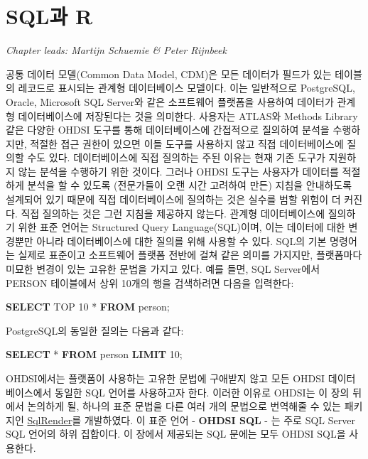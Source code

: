 \documentclass[11pt]{book}
\newenvironment{Shaded}{\begin{snugshade}}{\end{snugshade}}
\newcommand{\KeywordTok}[1]{\textcolor[rgb]{0.13,0.29,0.53}{\textbf{#1}}}
\newcommand{\DecValTok}[1]{\textcolor[rgb]{0.00,0.00,0.81}{#1}}
\newcommand{\NormalTok}[1]{#1}
\theoremstyle{definition}
\theoremstyle{definition}
\theoremstyle{definition}
\theoremstyle{remark}
\begin{document}
\chapter{SQL과 R}\label{SqlAndR}

\emph{Chapter leads: Martijn Schuemie \& Peter Rijnbeek}

공통 데이터 모델(Common Data Model, CDM)은 모든 데이터가 필드가 있는
테이블의 레코드로 표시되는 관계형 데이터베이스 모델이다. 이는 일반적으로
PostgreSQL, Oracle, Microsoft SQL Server와 같은 소프트웨어 플랫폼을
사용하여 데이터가 관계형 데이터베이스에 저장된다는 것을 의미한다.
사용자는 ATLAS와 Methods Library 같은 다양한 OHDSI 도구를 통해
데이터베이스에 간접적으로 질의하여 분석을 수행하지만, 적절한 접근 권한이
있으면 이들 도구를 사용하지 않고 직접 데이터베이스에 질의할 수도 있다.
데이터베이스에 직접 질의하는 주된 이유는 현재 기존 도구가 지원하지 않는
분석을 수행하기 위한 것이다. 그러나 OHDSI 도구는 사용자가 데이터를
적절하게 분석을 할 수 있도록 (전문가들이 오랜 시간 고려하여 만든) 지침을
안내하도록 설계되어 있기 때문에 직접 데이터베이스에 질의하는 것은 실수를
범할 위험이 더 커진다. 직접 질의하는 것은 그런 지침을 제공하지 않는다.
관계형 데이터베이스에 질의하기 위한 표준 언어는 Structured Query
Language(SQL)이며, 이는 데이터에 대한 변경뿐만 아니라 데이터베이스에
대한 질의를 위해 사용할 수 있다. SQL의 기본 명령어는 실제로 표준이고
소프트웨어 플랫폼 전반에 걸쳐 같은 의미를 가지지만, 플랫폼마다 미묘한
변경이 있는 고유한 문법을 가지고 있다. 예를 들면, SQL Server에서 PERSON
테이블에서 상위 10개의 행을 검색하려면 다음을 입력한다: 

\begin{Shaded}
\begin{Highlighting}[]
\KeywordTok{SELECT}\NormalTok{ TOP }\DecValTok{10}\NormalTok{ * }\KeywordTok{FROM}\NormalTok{ person;}
\end{Highlighting}
\end{Shaded}

PostgreSQL의 동일한 질의는 다음과 같다:

\begin{Shaded}
\begin{Highlighting}[]
\KeywordTok{SELECT}\NormalTok{ * }\KeywordTok{FROM}\NormalTok{ person }\KeywordTok{LIMIT} \DecValTok{10}\NormalTok{;}
\end{Highlighting}
\end{Shaded}

OHDSI에서는 플랫폼이 사용하는 고유한 문법에 구애받지 않고 모든 OHDSI
데이터베이스에서 동일한 SQL 언어를 사용하고자 한다. 이러한 이유로
OHDSI는 이 장의 뒤에서 논의하게 될, 하나의 표준 문법을 다른 여러 개의
문법으로 번역해줄 수 있는 패키지인
\href{https://ohdsi.github.io/SqlRender/}{SqlRender}를 개발하였다. 이
표준 언어 - \textbf{OHDSI SQL} - 는 주로 SQL Server SQL 언어의 하위
집합이다. 이 장에서 제공되는 SQL 문에는 모두 OHDSI SQL을 사용한다.
 
\end{document}

